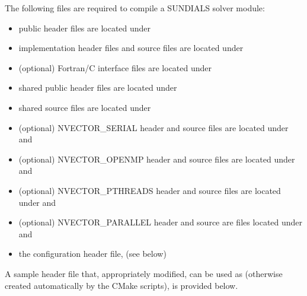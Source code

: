 \documentclass[letterpaper,10pt,english]{sphinxmanual}
\begin{document}
The following files are required to compile a SUNDIALS solver module:
\begin{itemize}
\item {} 
public header files are located under 

\item {} 
implementation header files and source files are located under

\item {} 
(optional) Fortran/C interface files are located under

\item {} 
shared public header files are located under

\item {} 
shared source files are located under 

\item {} 
(optional) NVECTOR\_SERIAL header and source files are located under
 and 

\item {} 
(optional) NVECTOR\_OPENMP header and source files are located under
 and 

\item {} 
(optional) NVECTOR\_PTHREADS header and source files are located under
 and 

\item {} 
(optional) NVECTOR\_PARALLEL header and source are files located
under  and 

\item {} 
the configuration header file,  (see below)

\end{itemize}

A sample header file that, appropriately modified, can be used as
 (otherwise created automatically by the
CMake scripts), is provided below.
\end{document}
